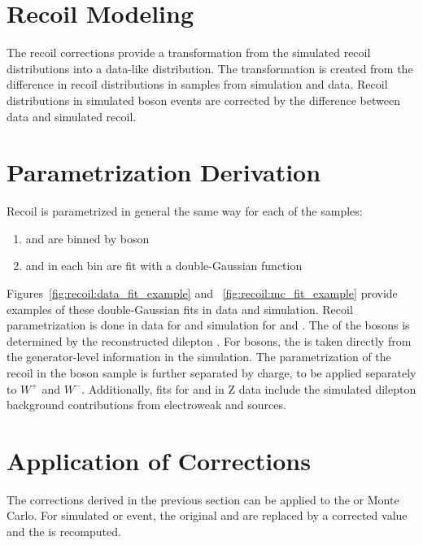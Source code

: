 


\section{Recoil Modeling} \label{ch:recoil:modeling}
The recoil corrections provide a transformation from the simulated recoil distributions into a data-like distribution. The transformation is created from the difference in recoil distributions in \zll samples from simulation and data. Recoil distributions in simulated \W boson events are corrected by the difference between data and simulated \zll recoil.

\section{Parametrization Derivation}
Recoil is parametrized in general the same way for each of the samples:
\begin{enumerate}
\item \upar and \uprp are binned by boson \pt
\item \upar and \uprp  in each \pt bin are fit with a double-Gaussian function
\end{enumerate}
Figures~\ref{fig:recoil:data_fit_example}
 and ~\ref{fig:recoil:mc_fit_example} provide examples of these double-Gaussian fits in data and simulation. Recoil parametrization is done in data for \zmm and simulation for \zmm and \wmunu. The \pt of the \Z bosons is determined by the reconstructed dilepton \pt. For \W bosons, the \pt is taken directly from the generator-level information in the simulation. The parametrization of the recoil in the \W boson sample is further separated by charge, to be applied separately to $W^+$ and $W^-$.
Additionally, fits for \upar and \uprp in Z data include the simulated dilepton background contributions from electroweak and \ttbar sources.





\section{Application of Corrections}\label{ch:recoil:apply}
The corrections derived in the previous section can be applied to the \W or \Z Monte Carlo. For simulated \W or \Z event, the original \upar and \uprp are replaced by a corrected value and the \met is recomputed. 
